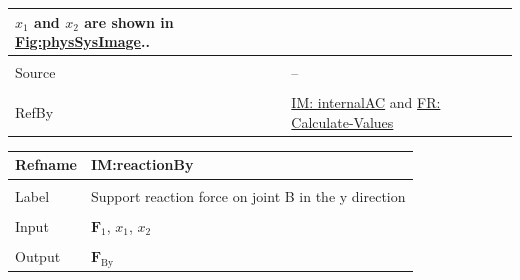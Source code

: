\documentclass[12pt]{article}
\begin{document}
\begin{minipage}{\textwidth}
\begin{tabular}{>{\raggedright}p{}>{\raggedright\arraybackslash}p{}}
        ${x_{\text{1}}}$ and ${x_{\text{2}}}$ are shown in \hyperref[Figure:physSysImage]{Fig:physSysImage}..
        
\\ \midrule \\
Source & --
         
\\ \midrule \\
RefBy & \hyperref[IM:internalAC]{IM: internalAC} and \hyperref[calcValues]{FR: Calculate-Values}
        
\\ \bottomrule
\end{tabular}
\end{minipage}

\vspace{\baselineskip}
\noindent
\begin{minipage}{\textwidth}
\begin{tabular}{>{\raggedright}p{}>{\raggedright\arraybackslash}p{}}
\toprule \textbf{Refname} & \textbf{IM:reactionBy}
\label{IM:reactionBy}
\\ \midrule \\
Label & Support reaction force on joint B in the y direction
        
\\ \midrule \\
Input & ${\mathbf{F}_{1}}$, ${x_{\text{1}}}$, ${x_{\text{2}}}$
        
\\ \midrule \\
Output & ${\mathbf{F}_{\text{By}}}$
         

\end{tabular}
\end{minipage}
\end{document}
